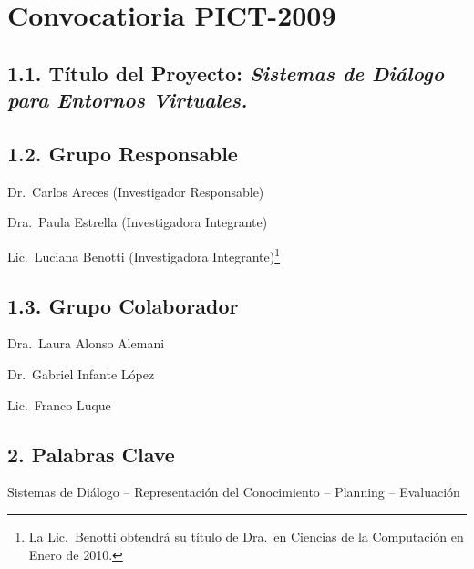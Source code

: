 \documentclass[11pt]{article}
\newcommand{\MySubSection}[1]{\vspace*{-.1\baselineskip}%
\subsection*{\sffamily\textbf
#1}\vspace*{-.2\baselineskip}}
\begin{document}
%
\thispagestyle{plain}

\section*{\sffamily\textbf{Convocatioria PICT-2009}}
\mbox{}

\vspace*{-.5\baselineskip}
\MySubSection{1.1. T\'itulo del Proyecto:
{\rm \emph{\Large Sistemas de Di\'alogo para Entornos Virtuales.}}}

\MySubSection{1.2. Grupo Responsable}

\hspace*{.5cm} Dr.\ Carlos Areces (Investigador Responsable)

Dra.\ Paula Estrella (Investigadora Integrante)

Lic.\ Luciana Benotti (Investigadora Integrante)\footnote{La Lic.\ Benotti
obtendr\'a su t\'itulo de Dra.\ en Ciencias de la Computaci\'on en Enero de 2010.}

\MySubSection{1.3. Grupo Colaborador}

\hspace*{.5cm}
Dra.\ Laura Alonso Alemani

Dr.\ Gabriel Infante L\'opez

Lic.\ Franco Luque

\MySubSection{2.  Palabras Clave}

Sistemas de Di\'alogo -- Representaci\'on del Conocimiento -- Planning
-- Evaluaci\'on




\end{document}
